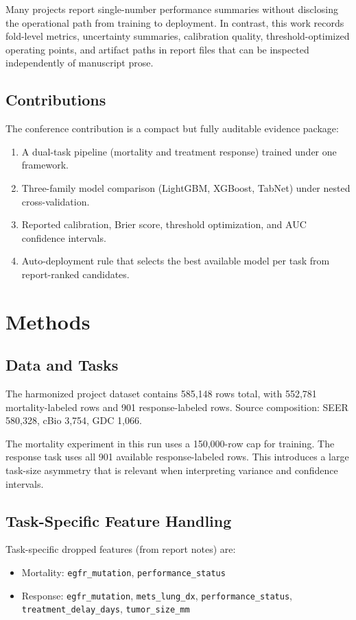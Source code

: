 \documentclass[conference]{IEEEtran}
\begin{document}
Many projects report single-number performance summaries without disclosing the operational path from training to deployment. In contrast, this work records fold-level metrics, uncertainty summaries, calibration quality, threshold-optimized operating points, and artifact paths in report files that can be inspected independently of manuscript prose.

\subsection{Contributions}
The conference contribution is a compact but fully auditable evidence package:
\begin{enumerate}
    \item A dual-task pipeline (mortality and treatment response) trained under one framework.
    \item Three-family model comparison (LightGBM, XGBoost, TabNet) under nested cross-validation.
    \item Reported calibration, Brier score, threshold optimization, and AUC confidence intervals.
    \item Auto-deployment rule that selects the best available model per task from report-ranked candidates.
\end{enumerate}

\section{Methods}
\subsection{Data and Tasks}
The harmonized project dataset contains 585,148 rows total, with 552,781 mortality-labeled rows and 901 response-labeled rows. Source composition: SEER 580,328, cBio 3,754, GDC 1,066.

The mortality experiment in this run uses a 150,000-row cap for training. The response task uses all 901 available response-labeled rows. This introduces a large task-size asymmetry that is relevant when interpreting variance and confidence intervals.

\subsection{Task-Specific Feature Handling}
Task-specific dropped features (from report notes) are:
\begin{itemize}
    \item Mortality: \texttt{egfr\_mutation}, \texttt{performance\_status}
    \item Response: \texttt{egfr\_mutation}, \texttt{mets\_lung\_dx}, \texttt{performance\_status}, \texttt{treatment\_delay\_days}, \texttt{tumor\_size\_mm}
\end{itemize}
\end{document}
